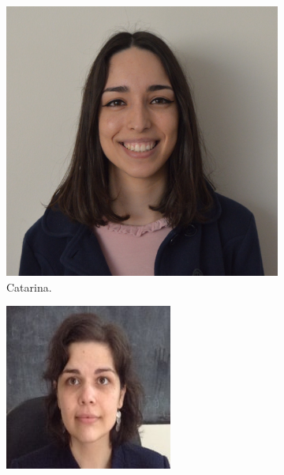 \documentclass[a4paper]{article}
\begin{document}
\begin{titlepage}
  \begin{figure}[h!]
    \centering
    \begin{subfigure}[b]{0.2\linewidth}
      \includegraphics[width=\linewidth]{imgs/catarina.jpeg}
       \caption{Catarina.}
    \end{subfigure}
    \begin{subfigure}[b]{0.2\linewidth}
      \includegraphics[width=\linewidth]{imgs/cecilia.jpeg}

\end{subfigure}
\end{figure}
\end{titlepage}
\end{document}
